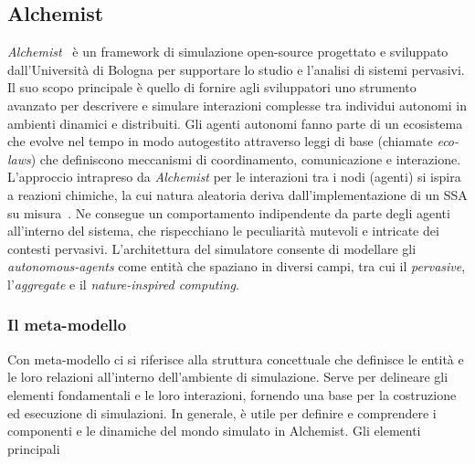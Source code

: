 \subsection{Alchemist}
\textit{Alchemist}~\cite{Pianini_2013} è un framework di simulazione open-source progettato e sviluppato dall'Università di Bologna per supportare lo studio e l'analisi di sistemi pervasivi.  Il suo scopo principale è quello di fornire agli sviluppatori uno strumento avanzato per descrivere e simulare interazioni complesse tra individui autonomi in ambienti dinamici e distribuiti. Gli agenti autonomi fanno parte di un ecosistema che evolve nel tempo in modo autogestito attraverso leggi di base (chiamate \textit{eco-laws}) che definiscono meccanismi di coordinamento, comunicazione e interazione. 
L'approccio intrapreso da \textit{Alchemist} per le interazioni tra i nodi (agenti) si ispira a reazioni chimiche, la cui natura aleatoria deriva dall'implementazione di un \ac{SSA} su misura~\cite{PMV2011}. Ne consegue  un comportamento indipendente da parte degli agenti all'interno del sistema, che rispecchiano le peculiarità mutevoli e intricate dei contesti pervasivi.
L'architettura del simulatore consente di modellare gli \textit{autonomous-agents} come entità che spaziano in diversi campi, tra cui il \textit{pervasive}, l'\textit{aggregate} e il \textit{nature-inspired computing}.

\subsubsection{Il meta-modello}
Con meta-modello ci si riferisce alla struttura concettuale che definisce le entità e le loro relazioni all'interno dell'ambiente di simulazione. Serve per delineare gli elementi fondamentali e le loro interazioni, fornendo una base per la costruzione ed esecuzione di simulazioni. In generale, è utile per definire e comprendere i componenti e le dinamiche del mondo simulato in Alchemist. Gli elementi principali 

